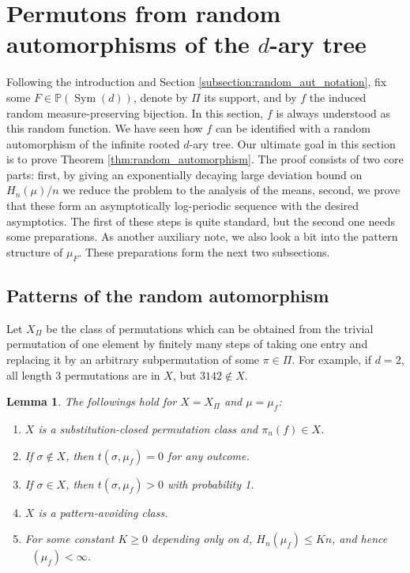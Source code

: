 \documentclass[11pt]{article}
\newcommand{\Sym}{\mathop{\mathrm{Sym}}}
\newcommand{\PP}{\mathbb{P}}
\newcommand{\upperlinent}{\mathop{\overline{H}^{\mathrm{lin}}}}
\newtheorem{lemma}[theorem]{Lemma}
\theoremstyle{definition}
\begin{document}
\section{Permutons from random automorphisms of the $d$-ary tree} \label{sec:random}

Following the introduction and Section \ref{subsection:random_aut_notation}, fix some $F\in \PP(\Sym(d))$, denote by $\Pi$ its support, and by $f$ the induced random measure-preserving bijection. In this section, $f$ is always understood as this random function. We have seen how $f$ can be identified with a random automorphism of the infinite rooted $d$-ary tree. Our ultimate goal in this section is to prove Theorem \ref{thm:random_automorphism}. The proof consists of two core parts: first, by giving an exponentially decaying large deviation bound on $H_n(\mu)/n$ we reduce the problem to the analysis of the means, second, we prove that these form an asymptotically log-periodic sequence with the desired asymptotics. The first of these steps is quite standard, but the second one needs some preparations. As another auxiliary note, we also look a bit into the pattern structure of $\mu_F$. These preparations form the next two subsections. 

\subsection{Patterns of the random automorphism}

Let $X_\Pi$ be the class of permutations which can be obtained from the trivial permutation of one element by finitely many steps of taking one entry and replacing it by an arbitrary subpermutation of some $\pi \in \Pi$. For example, if $d=2$, all length 3 permutations are in $X$, but $3142\notin X$.

\begin{lemma} \label{lemma:automorphism_finite_lin_entropy}
The followings hold for $X=X_\Pi$ and $\mu=\mu_f$:
\begin{enumerate}
    \item $X$ is a substitution-closed permutation class and $\pi_n(f)\in X$.
    \item If $\sigma\notin X$, then $t(\sigma, \mu_f)=0$ for any outcome.
    \item If $\sigma \in X$, then $t(\sigma, \mu_f)>0$ with probability 1.
    \item $X$ is a pattern-avoiding class.
    \item For some constant $K\geq 0$ depending only on $d$, $H_n(\mu_f)\leq Kn$, and hence $\upperlinent(\mu_f)<\infty$.
\end{enumerate}
\end{lemma}
\end{document}

